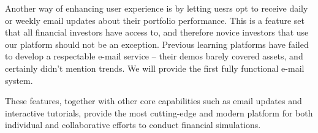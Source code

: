 Another way of enhancing user experience is by letting uesrs opt to receive daily or weekly email updates about their portfolio performance. This is a feature set that all financial investors have access to, and therefore novice investors that use our platform should not be an exception. Previous learning platforms have failed to develop a respectable e-mail service -- their demos barely covered assets, and certainly didn't mention trends. We will provide the first fully functional e-mail system.

These features, together with other core capabilities such as email updates and interactive tutorials, provide the most cutting-edge and modern platform for both individual and collaborative efforts to conduct financial simulations. 